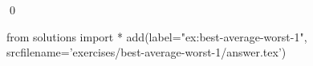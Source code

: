 
\begin{ex} 
  \label{ex:best-average-worst-1}
  
  \qed
\end{ex} 
\begin{python0}
from solutions import *
add(label="ex:best-average-worst-1",
    srcfilename='exercises/best-average-worst-1/answer.tex') 
\end{python0}
